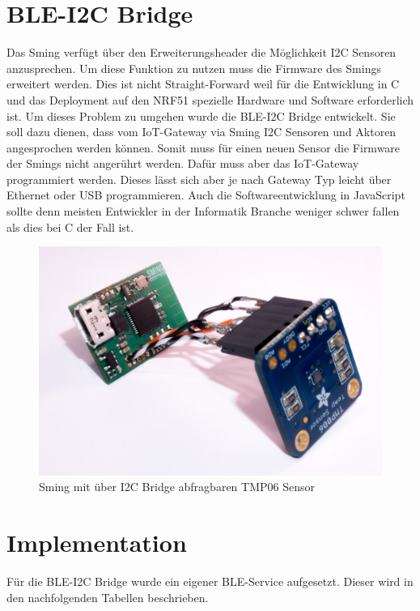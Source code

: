 \clearpage
\section{BLE-I2C Bridge}
\label{bleI2cBridge}

Das Sming verfügt über den Erweiterungsheader die Möglichkeit I2C Sensoren anzusprechen. Um diese Funktion zu nutzen muss die Firmware des Smings erweitert werden. Dies ist nicht Straight-Forward weil für die Entwicklung in C und das Deployment auf den NRF51 spezielle Hardware und Software erforderlich ist. Um dieses Problem zu umgehen wurde die BLE-I2C Bridge entwickelt. Sie soll dazu dienen, dass vom IoT-Gateway via Sming I2C Sensoren und Aktoren angesprochen werden können. Somit muss für einen neuen Sensor die Firmware der Smings nicht angerührt werden. Dafür muss aber das IoT-Gateway programmiert werden. Dieses lässt sich aber je nach Gateway Typ leicht über Ethernet oder USB programmieren. Auch die Softwareentwicklung in JavaScript sollte denn meisten Entwickler in der Informatik Branche weniger schwer fallen als dies bei C der Fall ist.

\begin{figure}[hbtp]
    \center
    \includegraphics[width=\textwidth]{bilder/foto-2.jpg}
    \caption{Sming mit über I2C Bridge abfragbaren TMP06 Sensor}
    \label{fig:sming_mit_tmp06}
\end{figure}

\clearpage
\section{Implementation}
\label{bleI2cImplementation}

Für die BLE-I2C Bridge wurde ein eigener BLE-Service aufgesetzt. Dieser wird in den nachfolgenden Tabellen beschrieben.

